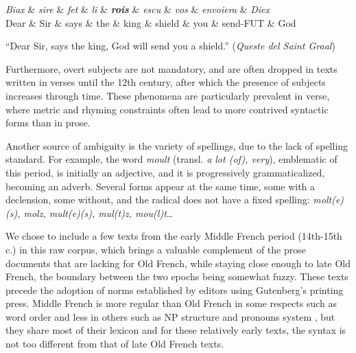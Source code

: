 \begin{center}
    \begin{dependency}[theme=simple]
        \begin{deptext}[row 2/.style={font=\small}]
            \textit{Biax} \& \textit{sire} \& \textit{fet} \& \textit{li} \& \textbf{\textit{rois}} \& \textit{escu} \& \textit{vos} \& \textit{envoiera} \& \textit{Diex} \\
            Dear \& Sir \& says \& the \& king \& shield \& you \& send-FUT \& God \\
        \end{deptext}
    \end{dependency}
    
    \raggedright
    \enquote{Dear Sir, says the king, God will send you a shield.} (\emph{Queste del Saint Graal})
\end{center}

Furthermore, overt subjects are not mandatory, and are often dropped in texts written in verses until the 12th century, after which the presence of subjects increases through time.
These phenomena are particularly prevalent in verse, where metric and rhyming constraints often lead to more contrived syntactic forms than in prose.

Another source of ambiguity is the variety of spellings, due to the lack of spelling standard. For example, the word \textit{moult} (transl. \textit{a lot (of), very}), emblematic of this period, is initially an adjective, and it is progressively grammaticalized, becoming an adverb. Several forms appear at the same time, some with a declension, some without, and the radical does not have a fixed spelling: \textit{molt(e)(s), molz, mult(e)(s), mul(t)z, mou(l)t}…

We chose to include a few texts from the early Middle French period (14th-15th c.) in this raw corpus, which brings a valuable complement of the prose documents that are lacking for Old French, while staying close enough to late Old French, the boundary between the two epochs being somewhat fuzzy.
These texts precede the adoption of norms established by editors using Gutenberg's printing press. Middle French is more regular than Old French in some respects such as word order \citep{GGHF2020GrandeGrammaireHist} and less in others such as NP structure and pronouns system \citep{marchello1979histoire}, but they share most of their lexicon and for these relatively early texts, the syntax is not too different from that of late Old French texts.  

